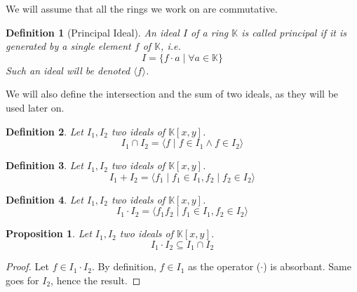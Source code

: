 \documentclass{article}
\newtheorem{definition}{Definition}[section]
\newtheorem{proposition}{Proposition}[section]
\begin{document}
We will assume that all the rings we work on are commutative. 

\begin{definition}[Principal Ideal]
    An ideal $I$ of a ring $\mathbb{K}$ is called principal if it is generated by a single element $f$ of $\mathbb{K}$, \textit{i.e.}
    \begin{displaymath}
        I = \{f \cdot a \mid \forall a \in \mathbb{K}\}
    \end{displaymath}
    Such an ideal will be denoted $\langle f \rangle$.
\end{definition}

We will also define the intersection and the sum of two ideals, as they will be used later on.

\begin{definition}
    Let $I_{1}, I_{2}$ two ideals of $\mathbb{K}[x, y]$. 
    \begin{displaymath}
        I_{1} \cap I_{2} = \langle f \mid f \in I_{1} \land f \in I_{2} \rangle
    \end{displaymath}
\end{definition}

\begin{definition}
    Let $I_{1}, I_{2}$ two ideals of $\mathbb{K}[x, y]$. 
    \begin{displaymath}
        I_{1} + I_{2} = \langle f_{1} \mid f_{1} \in I_{1}, f_{2} \mid f_{2} \in I_{2} \rangle
    \end{displaymath}
\end{definition}

\begin{definition}
    Let $I_{1}, I_{2}$ two ideals of $\mathbb{K}[x, y]$. 
    \begin{displaymath}
        I_{1} \cdot I_{2} = \langle f_{1}f_{2} \mid f_{1} \in I_{1}, f_{2} \in I_{2} \rangle
    \end{displaymath}
\end{definition}

\begin{proposition}
    Let $I_{1}, I_{2}$ two ideals of $\mathbb{K}[x, y]$. 
    \begin{displaymath}
        I_{1} \cdot I_{2} \subseteq I_{1} \cap I_{2}
    \end{displaymath}
\end{proposition}

\begin{proof}
    Let $f \in I_{1} \cdot I_{2}$. By definition, $f \in I_{1}$ as the operator ($\cdot$) is absorbant. Same goes for $I_{2}$, hence the result.
\end{proof}
\end{document}
